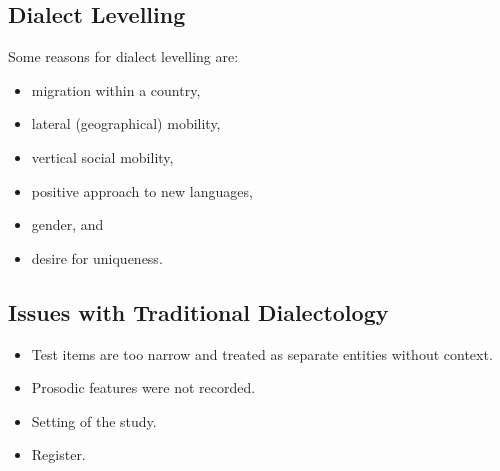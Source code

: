 \documentclass[../main.tex]{subfiles}
\begin{document}
        \subsection{Dialect Levelling}
        Some reasons for dialect levelling are: \begin{itemize}
            \item migration within a country,
            \item lateral (geographical) mobility,
            \item vertical social mobility,
            \item positive approach to new languages,
            \item gender, and
            \item desire for uniqueness.
        \end{itemize}

        \subsection{Issues with Traditional Dialectology}
        \begin{itemize}
            \item Test items are too narrow and treated as separate entities without context.
            \item Prosodic features were not recorded.
            \item Setting of the study.
            \item Register.
        \end{itemize}
        
\end{document}
